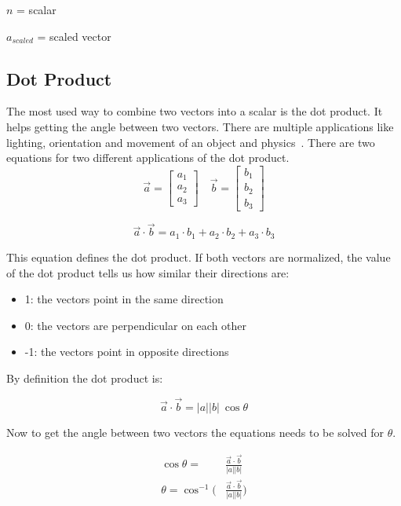 $n$ = scalar

$a_{scaled}$ = scaled vector \\



\subsection{Dot Product}
The most used way to combine two vectors into a scalar is the dot product. It helps getting the angle between two vectors. There are multiple applications like lighting, orientation and movement of an object and physics\ \cite{Web:12}. There are two equations for two different applications of the dot product.
\[
\vec{a} = \begin{bmatrix}
a_{1}\\
a_{2}\\
a_{3}
\end{bmatrix}
\quad
\vec{b} = \begin{bmatrix}
b_{1}\\
b_{2}\\
b_{3}
\end{bmatrix}
\]

\[
\vec{a} \cdot \vec{b} = a_{1}\cdot b_{1} +a_{2}\cdot b_{2} +a_{3}\cdot b_{3}
\]

This equation defines the dot product. If both vectors are normalized, the value of the dot product tells us how similar their directions are:
\begin{itemize}
    \item 1: the vectors point in the same direction
    \item 0: the vectors are perpendicular on each other 
    \item -1: the vectors point in opposite directions 
\end{itemize}

\noindent\cite{Web:14}

By definition the dot product is:

\[\vec{a} \cdot \vec{b} = \left| a \right|  \left| b \right| \ \cos\theta\]

Now to get the angle between two vectors the equations needs to be solved for $\theta$.\ \cite{Web:13}

\[
\begin{aligned}
\cos\theta = &\frac{\vec{a} \cdot \vec{b}}{\left| a \right|  \left| b \right|}\\
\theta = \cos^{-1}\biggl(&\frac{\vec{a} \cdot \vec{b}}{\left| a \right|  \left| b \right|}\biggr)
\end{aligned}
\]


